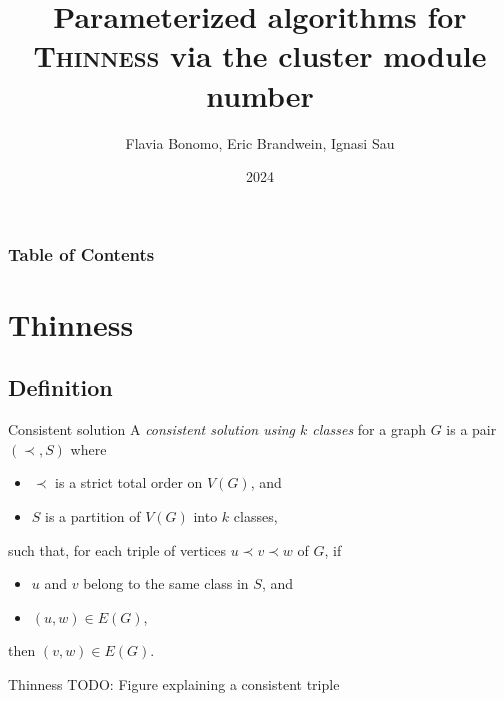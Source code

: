 \documentclass{beamer}
\title[Param. algorithms for \text{Thinness} via the cluster module number]{Parameterized algorithms for \textsc{Thinness} via the cluster module number}
\author{Flavia Bonomo, Eric Brandwein, Ignasi Sau}
\institute{Group: Graph Theory and Combinatorial Optimization}
\date{2024}
\begin{document}

\frame{\titlepage}


\begin{frame}
    \frametitle{Table of Contents}
    \tableofcontents[hideallsubsections]
\end{frame}

\section{Thinness}
\subsection{Definition}
\begin{frame}{Consistent solution}
    A \emph{consistent solution using $k$ classes} for a graph $G$ is a pair $(\prec, S)$ where 
    \begin{itemize}
        \item $\prec$ is a strict total order on $V(G)$, and 
        \item $S$ is a partition of $V(G)$ into $k$ classes,
    \end{itemize}
    such that, for each triple of vertices $u\prec v \prec w$ of $G$, if
    \begin{itemize}
        \item $u$ and $v$ belong to the same class in $S$, and
        \item $(u,w) \in E(G)$,
    \end{itemize}
    then $(v,w) \in E(G)$.
\end{frame}

\begin{frame}{Thinness}
    TODO: Figure explaining a consistent triple
\end{frame}
\end{document}

